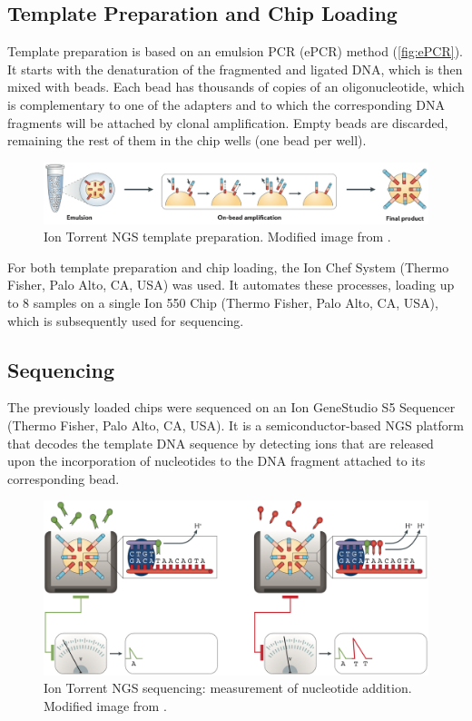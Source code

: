 \subsection{Template Preparation and Chip Loading}

Template preparation is based on an emulsion PCR (ePCR) method (\autoref{fig:ePCR}). It starts with the denaturation of the fragmented and ligated DNA, which is then mixed with beads. Each bead has thousands of copies of an oligonucleotide, which is complementary to one of the adapters and to which the corresponding DNA fragments will be attached by clonal amplification. Empty beads are discarded, remaining the rest of them in the chip wells (one bead per well).

\begin{figure}[ht]
    \centering
    \includegraphics[width=\textwidth]{Images/chapter_3/ePCR.png}
    \caption{Ion Torrent\texttrademark{} NGS template preparation. Modified image from \cite{NGS}.}
    \label{fig:ePCR}
\end{figure}

For both template preparation and chip loading, the Ion Chef\texttrademark{} System (Thermo Fisher, Palo Alto, CA, USA) was used. It automates these processes, loading up to 8 samples on a single Ion 550\texttrademark{} Chip (Thermo Fisher, Palo Alto, CA, USA), which is subsequently used for sequencing.

\subsection{Sequencing}

The previously loaded chips were sequenced on an Ion GeneStudio\texttrademark{} S5 Sequencer (Thermo Fisher, Palo Alto, CA, USA). It is a semiconductor-based NGS platform that decodes the template DNA sequence by detecting  ions that are released upon the incorporation of nucleotides to the DNA fragment attached to its corresponding bead. 

\begin{figure}[ht]
    \centering
    \includegraphics[width=\textwidth]{Images/chapter_3/NGS_sequencing.png}
    \caption{Ion Torrent\texttrademark{} NGS sequencing: measurement of nucleotide addition. Modified image from \cite{NGS}.}
    \label{fig:NGS_sequencing}
\end{figure}


